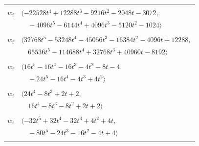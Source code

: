 \documentclass[11pt]{article}
\begin{document}
\begin{longtable}{@{}ll@{}}
\addlinespace[2pt]
\multicolumn{2}{@{}p{0.97\textwidth}@{}}{$i=19$, $D_i=512$, $\rho_{ij}$: $6{:}1, \allowbreak 7{:}2, \allowbreak 11{:}2, \allowbreak 13{:}1, \allowbreak 28{:}2, \allowbreak 38{:}1, \allowbreak 39{:}1, \allowbreak 44{:}2$}\\
$w_i$ & $\langle -22528t^{4}+12288t^{3}-9216t^{2}-2048t-3072,$\\
 & $\quad -4096t^{5}-6144t^{4}+4096t^{3}-5120t^{2}-1024\rangle$\\
\addlinespace[2pt]
\multicolumn{2}{@{}p{0.97\textwidth}@{}}{$i=20$, $D_i=4096$, $\rho_{ij}$: $12{:}2, \allowbreak 16{:}2, \allowbreak 17{:}1, \allowbreak 30{:}1, \allowbreak 34{:}1, \allowbreak 40{:}2, \allowbreak 44{:}2, \allowbreak 56{:}2$}\\
$w_i$ & $\langle 32768t^{5}-53248t^{4}-45056t^{3}-16384t^{2}-4096t+12288,$\\
 & $\quad 65536t^{5}-114688t^{4}+32768t^{3}+40960t-8192\rangle$\\
\addlinespace[2pt]
\multicolumn{2}{@{}p{0.97\textwidth}@{}}{$i=21$, $D_i=2$, $\rho_{ij}$: $1{:}1, \allowbreak 2{:}1, \allowbreak 4{:}1, \allowbreak 7{:}1, \allowbreak 37{:}2, \allowbreak 48{:}2, \allowbreak 50{:}1, \allowbreak 51{:}1, \allowbreak 53{:}1, \allowbreak 58{:}1$}\\
$w_i$ & $\langle 16t^{5}-16t^{4}-16t^{3}-4t^{2}-8t-4,$\\
 & $\quad -24t^{5}-16t^{4}-4t^{3}+4t^{2}\rangle$\\
\addlinespace[2pt]
\multicolumn{2}{@{}p{0.97\textwidth}@{}}{$i=22$, $D_i=2$, $\rho_{ij}$: $2{:}2, \allowbreak 31{:}1, \allowbreak 34{:}1, \allowbreak 42{:}1, \allowbreak 45{:}2, \allowbreak 47{:}1, \allowbreak 48{:}1, \allowbreak 50{:}1, \allowbreak 55{:}1$}\\
$w_i$ & $\langle 24t^{4}-8t^{3}+2t+2,$\\
 & $\quad 16t^{4}-8t^{3}-8t^{2}+2t+2\rangle$\\
\addlinespace[2pt]
\multicolumn{2}{@{}p{0.97\textwidth}@{}}{$i=23$, $D_i=4$, $\rho_{ij}$: $13{:}1, \allowbreak 24{:}2, \allowbreak 28{:}2, \allowbreak 34{:}1, \allowbreak 37{:}1, \allowbreak 39{:}2, \allowbreak 44{:}2, \allowbreak 45{:}2, \allowbreak 52{:}1, \allowbreak 55{:}1$}\\
$w_i$ & $\langle -32t^{5}+32t^{4}-32t^{3}+4t^{2}+4t,$\\
 & $\quad -80t^{5}-24t^{3}-16t^{2}-4t+4\rangle$\\
\addlinespace[2pt]
\multicolumn{2}{@{}p{0.97\textwidth}@{}}{$i=24$, $D_i=32$, $\rho_{ij}$: $2{:}2, \allowbreak 16{:}2, \allowbreak 23{:}1, \allowbreak 26{:}1, \allowbreak 44{:}1, \allowbreak 49{:}2$}\\

\end{longtable}
\end{document}
